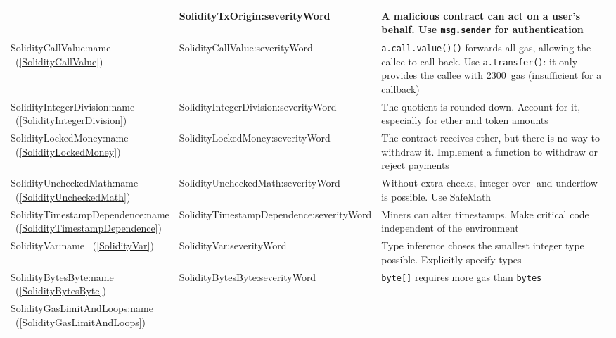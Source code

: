 \begin{table}[]
\begin{tabular}{|p{0.25\linewidth}|p{0.1\linewidth}|p{0.65\linewidth}|}
		&
		\usevalue SolidityTxOrigin:severityWord 
		&
		A malicious contract can act on a user's behalf.
		Use \texttt{msg.sender} for authentication
		\\
		\hline
		\rowcolor{lightlightgray}
		\usevalue SolidityCallValue:name ~(\ref{SolidityCallValue})
		&
		\usevalue SolidityCallValue:severityWord 
		&
		\texttt{a.call.value()()} forwards all gas, allowing the callee to call back.
		Use \texttt{a.transfer()}: it only provides the callee with 2300~gas (insufficient for a callback)
		\\
		\hline
		\rowcolor{lightlightgray}
		\usevalue SolidityIntegerDivision:name ~(\ref{SolidityIntegerDivision})
		&
		\usevalue SolidityIntegerDivision:severityWord 
		&
		The quotient is rounded down.
		Account for it, especially for ether and token amounts
		\\
		\hline
		\rowcolor{lightlightgray}
		\usevalue SolidityLockedMoney:name ~(\ref{SolidityLockedMoney})
		&
		\usevalue SolidityLockedMoney:severityWord 
		&
		The contract receives ether, but there is no way to withdraw it.
		Implement a function to withdraw or reject payments
		\\
		\hline
		\usevalue SolidityUncheckedMath:name ~(\ref{SolidityUncheckedMath})
		&
		\usevalue SolidityUncheckedMath:severityWord 
		&
		Without extra checks, integer over- and underflow is possible.
		Use \hbox{SafeMath}
		\\
		\hline
		\rowcolor{lightlightgray}
		\usevalue SolidityTimestampDependence:name ~(\ref{SolidityTimestampDependence})
		&
		\usevalue SolidityTimestampDependence:severityWord 
		&
		Miners can alter timestamps.
		Make critical code independent of the environment
		\\
		\hline
		\rowcolor{lightlightgray}
		\usevalue SolidityVar:name ~(\ref{SolidityVar})
		&
		\usevalue SolidityVar:severityWord 
		&
		Type inference choses the smallest integer type possible.
		Explicitly specify types
		\\
		\hline
		\usevalue SolidityBytesByte:name ~(\ref{SolidityBytesByte})
		&
		\usevalue SolidityBytesByte:severityWord 
		&
		\texttt{byte[]} requires more gas than \texttt{bytes}
		\\
		\hline
		\rowcolor{lightlightgray}
		\usevalue SolidityGasLimitAndLoops:name ~(\ref{SolidityGasLimitAndLoops})
		&

\end{tabular}
\end{table}
